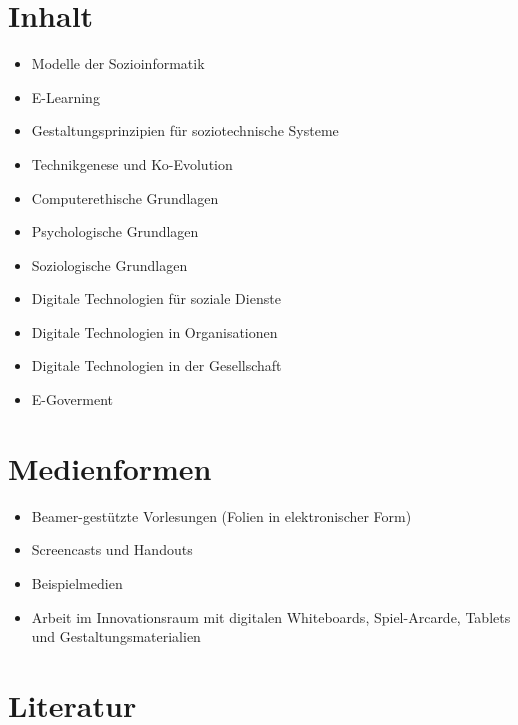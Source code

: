 \hypertarget{inhaltpathlabelmi-2017modulbeschreibungen-bachelorba_sc_soziotechnische-systeme}{%
\section*{Inhalt\label{/mi-2017/modulbeschreibungen-bachelor/BA_SC_soziotechnische-systeme}}\label{inhaltpathlabelmi-2017modulbeschreibungen-bachelorba_sc_soziotechnische-systeme}}

\begin{itemize}
\tightlist
\item
  Modelle der Sozioinformatik
\item
  E-Learning
\item
  Gestaltungsprinzipien für soziotechnische Systeme
\item
  Technikgenese und Ko-Evolution
\item
  Computerethische Grundlagen
\item
  Psychologische Grundlagen
\item
  Soziologische Grundlagen
\item
  Digitale Technologien für soziale Dienste
\item
  Digitale Technologien in Organisationen
\item
  Digitale Technologien in der Gesellschaft
\item
  E-Goverment
\end{itemize}

\hypertarget{medienformenpathlabelmi-2017modulbeschreibungen-bachelorba_sc_soziotechnische-systeme}{%
\section*{Medienformen\label{/mi-2017/modulbeschreibungen-bachelor/BA_SC_soziotechnische-systeme}}\label{medienformenpathlabelmi-2017modulbeschreibungen-bachelorba_sc_soziotechnische-systeme}}

\begin{itemize}
\tightlist
\item
  Beamer-gestützte Vorlesungen (Folien in elektronischer Form)
\item
  Screencasts und Handouts
\item
  Beispielmedien
\item
  Arbeit im Innovationsraum mit digitalen Whiteboards, Spiel-Arcarde,
  Tablets und Gestaltungsmaterialien
\end{itemize}

\hypertarget{literaturpathlabelmi-2017modulbeschreibungen-bachelorba_sc_soziotechnische-systeme}{%
\section*{Literatur\label{/mi-2017/modulbeschreibungen-bachelor/BA_SC_soziotechnische-systeme}}\label{literaturpathlabelmi-2017modulbeschreibungen-bachelorba_sc_soziotechnische-systeme}}

